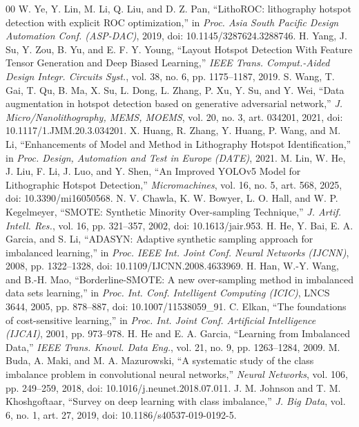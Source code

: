 \documentclass[conference]{IEEEtran}
\begin{document}
\begin{thebibliography}{00}
 W. Ye, Y. Lin, M. Li, Q. Liu, and D. Z. Pan, ``LithoROC: lithography hotspot detection with explicit ROC optimization,'' in \emph{Proc. Asia South Pacific Design Automation Conf. (ASP-DAC)}, 2019, doi: 10.1145/3287624.3288746.
 H. Yang, J. Su, Y. Zou, B. Yu, and E. F. Y. Young, ``Layout Hotspot Detection With Feature Tensor Generation and Deep Biased Learning,'' \emph{IEEE Trans. Comput.-Aided Design Integr. Circuits Syst.}, vol. 38, no. 6, pp. 1175--1187, 2019.
 S. Wang, T. Gai, T. Qu, B. Ma, X. Su, L. Dong, L. Zhang, P. Xu, Y. Su, and Y. Wei, ``Data augmentation in hotspot detection based on generative adversarial network,'' \emph{J. Micro/Nanolithography, MEMS, MOEMS}, vol. 20, no. 3, art. 034201, 2021, doi: 10.1117/1.JMM.20.3.034201.
 X. Huang, R. Zhang, Y. Huang, P. Wang, and M. Li, ``Enhancements of Model and Method in Lithography Hotspot Identification,'' in \emph{Proc. Design, Automation and Test in Europe (DATE)}, 2021.
 M. Lin, W. He, J. Liu, F. Li, J. Luo, and Y. Shen, ``An Improved YOLOv5 Model for Lithographic Hotspot Detection,'' \emph{Micromachines}, vol. 16, no. 5, art. 568, 2025, doi: 10.3390/mi16050568.
 N. V. Chawla, K. W. Bowyer, L. O. Hall, and W. P. Kegelmeyer, ``SMOTE: Synthetic Minority Over-sampling Technique,'' \emph{J. Artif. Intell. Res.}, vol. 16, pp. 321--357, 2002, doi: 10.1613/jair.953.
 H. He, Y. Bai, E. A. Garcia, and S. Li, ``ADASYN: Adaptive synthetic sampling approach for imbalanced learning,'' in \emph{Proc. IEEE Int. Joint Conf. Neural Networks (IJCNN)}, 2008, pp. 1322--1328, doi: 10.1109/IJCNN.2008.4633969.
 H. Han, W.-Y. Wang, and B.-H. Mao, ``Borderline-SMOTE: A new over-sampling method in imbalanced data sets learning,'' in \emph{Proc. Int. Conf. Intelligent Computing (ICIC)}, LNCS 3644, 2005, pp. 878--887, doi: 10.1007/11538059\_91.
 C. Elkan, ``The foundations of cost-sensitive learning,'' in \emph{Proc. Int. Joint Conf. Artificial Intelligence (IJCAI)}, 2001, pp. 973--978.
 H. He and E. A. Garcia, ``Learning from Imbalanced Data,'' \emph{IEEE Trans. Knowl. Data Eng.}, vol. 21, no. 9, pp. 1263--1284, 2009.
 M. Buda, A. Maki, and M. A. Mazurowski, ``A systematic study of the class imbalance problem in convolutional neural networks,'' \emph{Neural Networks}, vol. 106, pp. 249--259, 2018, doi: 10.1016/j.neunet.2018.07.011.
 J. M. Johnson and T. M. Khoshgoftaar, ``Survey on deep learning with class imbalance,'' \emph{J. Big Data}, vol. 6, no. 1, art. 27, 2019, doi: 10.1186/s40537-019-0192-5.

\end{thebibliography}
\end{document}
